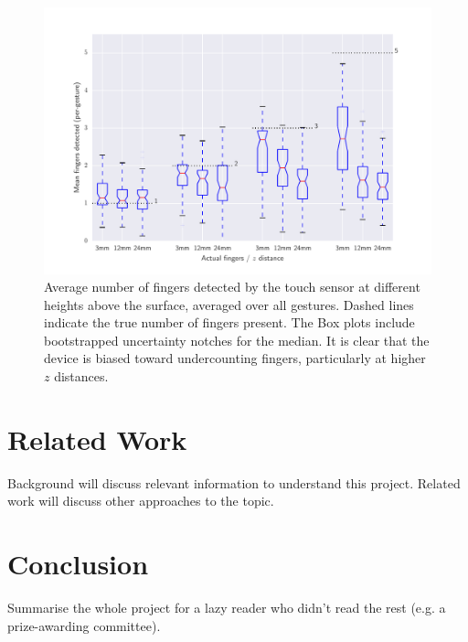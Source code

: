 \documentclass{l4proj}
\theoremstyle{definition}
\begin{document}
\begin{figure}
    \centering
    \includegraphics[width=1.0\linewidth]{images/boxplot_finger_distance.pdf}    

    \caption{Average number of fingers detected by the touch sensor at different heights above the surface, averaged over all gestures. Dashed lines indicate
    the true number of fingers present. The Box plots include bootstrapped uncertainty notches for the median. It is clear that the device is biased toward 
    undercounting fingers, particularly at higher $z$ distances.
    }

    \label{fig:boxplot} 
\end{figure}



\chapter{Related Work}
Background will discuss relevant information to understand this project. Related work will discuss other approaches to the topic.

\chapter{Conclusion}    
Summarise the whole project for a lazy reader who didn't read the rest (e.g. a prize-awarding committee).
\end{document}
